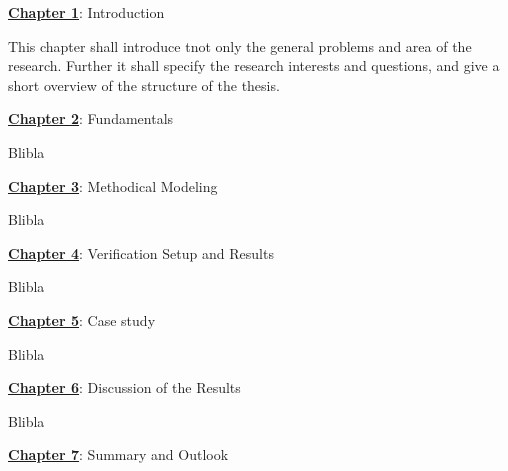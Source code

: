 \begin{tcolorbox}[colback=ees_blue!5!white,colframe=ees_blue, left=2mm, right=2.5mm, top=2mm, bottom=2mm]
    \textbf{\hyperref[chap:intro]{Chapter 1}}: Introduction
\end{tcolorbox}

This chapter shall introduce tnot only the general problems and area of the research. Further it shall specify the research interests and questions, and give a short overview of the structure of the thesis.

\begin{tcolorbox}[colback=ees_blue!5!white,colframe=ees_blue, left=2mm, right=2.5mm, top=2mm, bottom=2mm]
    \textbf{\hyperref[chap:fundamentals]{Chapter 2}}: Fundamentals
\end{tcolorbox}

Blibla

\begin{tcolorbox}[colback=ees_blue!5!white,colframe=ees_blue, left=2mm, right=2.5mm, top=2mm, bottom=2mm]
    \textbf{\hyperref[chap:methodical-modeling]{Chapter 3}}: Methodical Modeling
\end{tcolorbox}

Blibla

\begin{tcolorbox}[colback=ees_blue!5!white,colframe=ees_blue, left=2mm, right=2.5mm, top=2mm, bottom=2mm]
    \textbf{\hyperref[chap:verification]{Chapter 4}}: Verification Setup and Results
\end{tcolorbox}

Blibla

\begin{tcolorbox}[colback=ees_blue!5!white,colframe=ees_blue, left=2mm, right=2.5mm, top=2mm, bottom=2mm]
    \textbf{\hyperref[chap:case-study]{Chapter 5}}: Case study
\end{tcolorbox}

Blibla

\begin{tcolorbox}[colback=ees_blue!5!white,colframe=ees_blue, left=2mm, right=2.5mm, top=2mm, bottom=2mm]
    \textbf{\hyperref[chap:discussion]{Chapter 6}}: Discussion of the Results
\end{tcolorbox}

Blibla

\begin{tcolorbox}[colback=ees_blue!5!white,colframe=ees_blue, left=2mm, right=2.5mm, top=2mm, bottom=2mm]
    \textbf{\hyperref[chap:summary]{Chapter 7}}: Summary and Outlook
\end{tcolorbox}

